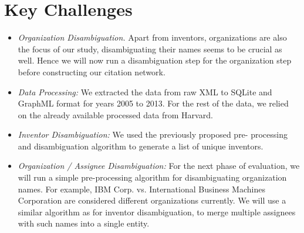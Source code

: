 \section{Key Challenges}
	\begin{itemize}
	\squish
		\item {\em Organization Disambiguation.} Apart from inventors, organizations are also the focus of
		our study, disambiguating their names seems to be crucial as well. Hence we will
		now run a disambiguation step for the organization step before constructing
		our citation network.
		\item {\em Data Processing:} We extracted the data from raw XML to SQLite and
		GraphML format for years 2005 to 2013. For the rest of the data, we relied on
		the already available processed data from Harvard.
		\item {\em Inventor Disambiguation:} We used the previously proposed pre-
		processing and disambiguation algorithm to generate a list of unique
		inventors.
		\item {\em Organization / Assignee Disambiguation:} For the next phase of
		evaluation, we will run a simple pre-processing algorithm for disambiguating
		organization names. For example, IBM Corp. vs. International Business Machines
		Corporation are considered different organizations currently. We will use a
		similar algorithm as for inventor disambiguation, to merge multiple assignees
		with such names into a single entity.
	\end{itemize}
